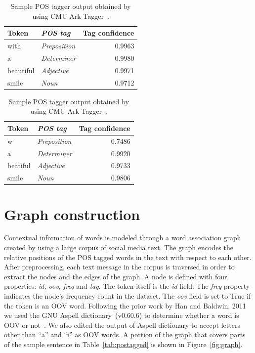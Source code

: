 \documentclass[a4paper,onesided,12pt]{report}
\begin{document}
\begin{table}[htbp]
\caption{Sample POS tagger output obtained by using CMU Ark Tagger~\cite{owoputi2013improved,Gimpel:2011:PTT:2002736.2002747}.}
\begin{minipage}{.5\linewidth}
\begin{tabular}[h]{|l>{\itshape}lr|}
 \hline
Token & POS tag & Tag confidence \\
 \hline
with & Preposition & 0.9963 \\
 \hline
a & Determiner & 0.9980 \\
 \hline
beautiful & Adjective & 0.9971 \\
 \hline
smile & Noun & 0.9712 \\
 \hline
\end{tabular}
\end{minipage}
\begin{minipage}{.5\linewidth}
\begin{tabular}[h]{|l>{\itshape}lr|}
 \hline
Token & POS tag & Tag confidence \\
 \hline
w & Preposition & 0.7486 \\
 \hline
a & Determiner & 0.9920 \\
 \hline
beatiful & Adjective & 0.9733 \\
 \hline
smile & Noun & 0.9806 \\
 \hline
\end{tabular}
\end{minipage}
\label{tab:postags}
\end{table}

\section{Graph construction}

Contextual information of words is modeled through a word association graph created by using a large corpus of social media text. The graph encodes the relative positions of the POS tagged words in the text with respect to each other. After preprocessing, each text message in the corpus is traversed in order to extract the nodes and the edges of the graph.
A node is defined with four properties: \textit{id, oov, freq} and \textit{tag}. The token itself is the \textit{id} field. The \textit{freq} property indicates the node's frequency count in the dataset. The \textit{oov} field is set to True if the token is an OOV word. Following the prior work by Han and Baldwin, 2011 we used the GNU Aspell dictionary~(v0.60.6) to determine whether a word is OOV or not~\cite{Han:2011:LNS:2002472.2002520}. We also edited the output of Aspell dictionary to accept letters other than ``a'' and ``i'' as OOV words. A portion of the graph that covers parts of the sample sentence in Table~\ref{tab:postagged} is shown in Figure~\ref{fig:graph}.
\end{document}
